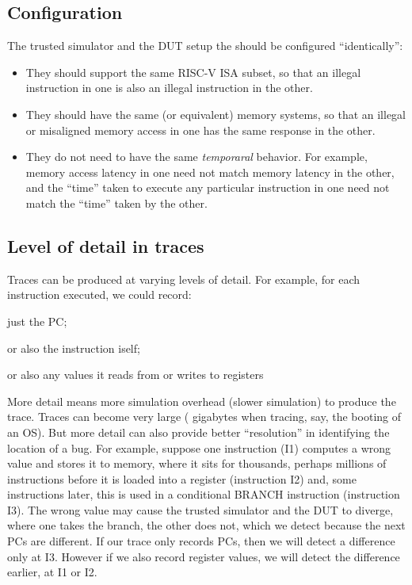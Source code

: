 
\subsection{Configuration}

The trusted simulator and the DUT setup the should be configured
``identically'':

\begin{itemize}
 \item They should support the same RISC-V ISA subset, so that an
       illegal instruction in one is also an illegal instruction in the
       other.  

 \item They should have the same (or equivalent) memory systems, so
       that an illegal or misaligned memory access in one has the same
       response in the other.

 \item They do not need to have the same \emph{temporaral} behavior.
       For example, memory access latency in one need not match memory
       latency in the other, and the ``time'' taken to execute any
       particular instruction in one need not match the ``time'' taken
       by the other.

\end{itemize}


\subsection{Level of detail in traces}

Traces can be produced at varying levels of detail.  For example, for
each instruction executed, we could record:

\begin{tightlist}
 \item just the PC;
 \item or also the instruction iself;
 \item or also any values it reads from or writes to registers
\end{tightlist}

More detail means more simulation overhead (slower simulation) to
produce the trace.  Traces can become very large ({\eg} gigabytes when
tracing, say, the booting of an OS).  But more detail can also provide
better ``resolution'' in identifying the location of a bug.  For
example, suppose one instruction (I1) computes a wrong value and
stores it to memory, where it sits for thousands, perhaps millions of
instructions before it is loaded into a register (instruction I2) and,
some instructions later, this is used in a conditional BRANCH
instruction (instruction I3).  The wrong value may cause the trusted
simulator and the DUT to diverge, where one takes the branch, the
other does not, which we detect because the next PCs are different.
If our trace only records PCs, then we will detect a difference only
at I3. However if we also record register values, we will detect the
difference earlier, at I1 or I2.

